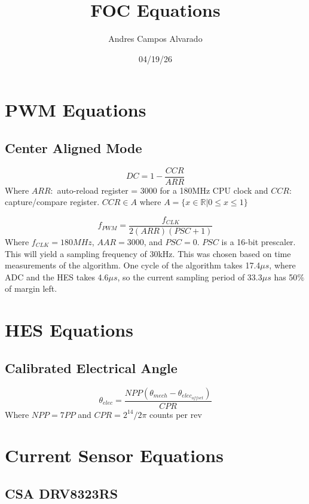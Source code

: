 \documentclass{article}
\title{FOC Equations}
\author{Andres Campos Alvarado}
\date{04/19/26}
\begin{document}
\maketitle

\section{PWM Equations}
\subsection{Center Aligned Mode}

\begin{equation}
    DC = 1-\frac{CCR}{ARR}
\end{equation}
Where $ARR:$ auto-reload register = 3000 for a 180MHz CPU clock and $CCR:$ capture/compare register. $CCR \in A$ where $A=\{x \in \mathbb{R} | 0\leq x \leq1\}$

\begin{equation}
    f_{PWM} = \frac{f_{CLK}}{2(ARR)(PSC+1)}
\end{equation}
Where $f_{CLK} = 180MHz$, $AAR = 3000$, and $PSC = 0$.
$PSC$ is a 16-bit prescaler. This will yield a sampling frequency of 30kHz. This was chosen based on time measurements of the algorithm. One cycle of the algorithm takes 17.4$\mu s$, where ADC and the HES takes 4.6$\mu s$, so the current sampling period of 33.3$\mu s$ has 50$\%$ of margin left. 

\section{HES Equations}
\subsection{Calibrated Electrical Angle}

\begin{equation}
    \theta_{elec} = \frac{NPP(\theta_{mech}-\theta_{elec_{offset}})}{CPR}
\end{equation}
Where $NPP = 7PP$ and $CPR = 2^{14}/2\pi$ counts per rev

\section{Current Sensor Equations}
\subsection{CSA DRV8323RS}
\end{document}
